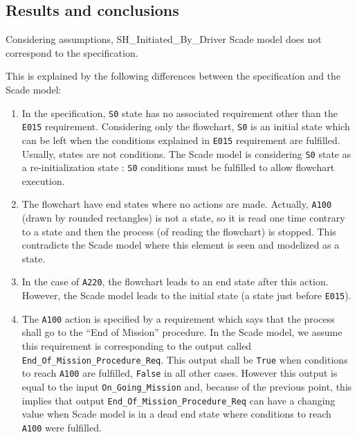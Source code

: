 \subsection{Results and conclusions}
\label{SH-results-and-conclusions}
Considering assumptions, SH\_Initiated\_By\_Driver Scade model does
not correspond to the specification.

This is explained by the following differences between the
specification and the Scade model:
\begin{enumerate} 
\item \label{s0-case}In the specification, \texttt{S0} state has no associated
  requirement other than the \texttt{E015} requirement. Considering
  only the flowchart, \texttt{S0} is an initial state which can be
  left when the conditions explained in \texttt{E015} requirement are
  fulfilled. Usually, states are not conditions.  The Scade model is
  considering \texttt{S0} state as a re-initialization state :
  \texttt{S0} conditions must be fulfilled to allow flowchart
  execution.
\item \label{a100-case}The flowchart have end states where no actions
  are made. Actually, \texttt{A100} (drawn by rounded rectangles) is
  not a state, so it is read one time contrary to a state and then the
  process (of reading the flowchart) is stopped. This contradicts the
  Scade model where this element is seen and modelized as a state.
\item \label{a220-case}In the case of \texttt{A220}, the flowchart leads to an end
  state after this action. However, the Scade model leads to the
  initial state (a state just before \texttt{E015}).
\item \label{eom-case}The \texttt{A100} action is specified by a requirement which
  says that the process shall go to the ``End of Mission''
  procedure. In the Scade model, we assume this requirement is
  corresponding to the output called
  \texttt{End\_Of\_Mission\_Procedure\_Req}. This output shall be
  \texttt{True} when conditions to reach \texttt{A100} are fulfilled,
  \texttt{False} in all other cases. However this output is equal to
  the input \texttt{On\_Going\_Mission} and, because of the previous
  point, this implies that output
  \texttt{End\_Of\_Mission\_Procedure\_Req} can have a changing value
  when Scade model is in a dead end state where conditions to reach
  \texttt{A100} were fulfilled.
\end{enumerate} 

